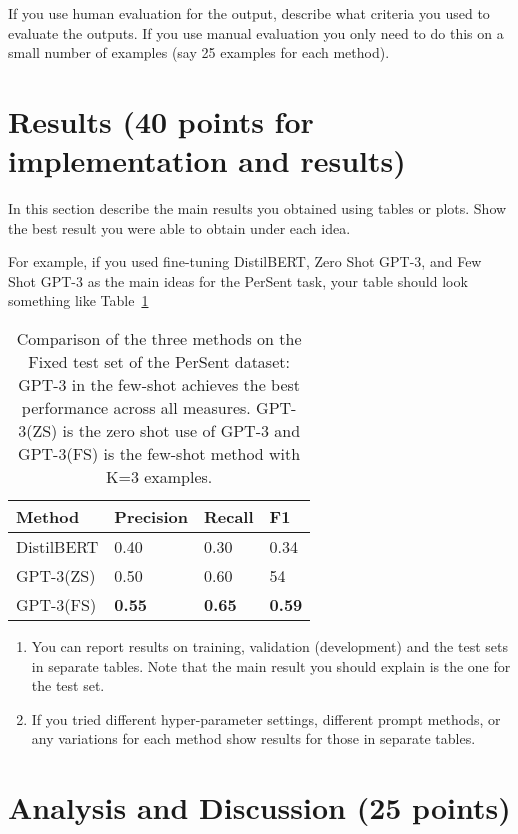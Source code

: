 \documentclass[11pt,a4paper]{article}
\begin{document}
If you use human evaluation for the output, describe what criteria you used to evaluate the outputs. If you use manual evaluation you only need to do this on a small number of examples (say 25 examples for each method).

\section{Results (40 points for implementation and results)}

In this section describe the main results you obtained using tables or plots. Show the best result you were able to obtain under each idea.

For example, if you used fine-tuning DistilBERT, Zero Shot GPT-3, and Few Shot GPT-3 as the main ideas for the PerSent task, your table should look something like Table~\ref{tab:results}

\begin{table}[t!]
\begin{tabular}{l|l|l|l}
\hline
Method & Precision & Recall & F1\\
\hline
DistilBERT & 0.40 & 0.30 & 0.34 \\
GPT-3(ZS) & 0.50 & 0.60 & 54 \\
GPT-3(FS) & \textbf{0.55} & \textbf{0.65} & \textbf{0.59}\\
\hline
\end{tabular}
\caption{Comparison of the three methods on the Fixed test set of the PerSent dataset: GPT-3 in the few-shot achieves the best performance across all measures. GPT-3(ZS) is the zero shot use of GPT-3 and GPT-3(FS) is the few-shot method with K=3 examples.}
\label{tab:results}
\end{table} 

\begin{enumerate}

\item You can report results on training, validation (development) and the test sets in separate tables. Note that the main result you should explain is the one for the test set. 

\item If you tried different hyper-parameter settings, different prompt methods, or any variations for each method show results for those in separate tables.
\end{enumerate}


\section{Analysis and Discussion (25 points)}
\end{document}
